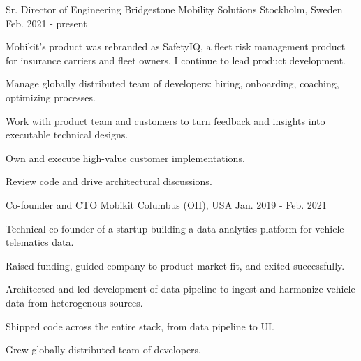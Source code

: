 

\begin{cventries}

  \cventry
    {Sr. Director of Engineering} %
    {Bridgestone Mobility Solutions} %
    {Stockholm, Sweden} %
    {Feb. 2021 - present} %
    {
      \begin{cvitems} %
        \item {Mobikit's product was rebranded as SafetyIQ, a fleet risk management product for insurance carriers and fleet owners. I continue to lead product development.}
        \item {Manage globally distributed team of developers: hiring, onboarding, coaching, optimizing processes.}
        \item {Work with product team and customers to turn feedback and insights into executable technical designs.}
        \item {Own and execute high-value customer implementations.}
        \item {Review code and drive architectural discussions.}
      \end{cvitems}
    }

  \cventry
    {Co-founder and CTO} %
    {Mobikit} %
    {Columbus (OH), USA} %
    {Jan. 2019 - Feb. 2021} %
    {
      \begin{cvitems} %
        \item {Technical co-founder of a startup building a data analytics platform for vehicle telematics data.}
        \item {Raised funding, guided company to product-market fit, and exited successfully.}
        \item {Architected and led development of data pipeline to ingest and harmonize vehicle data from heterogenous sources.}
        \item {Shipped code across the entire stack, from data pipeline to UI.}
        \item {Grew globally distributed team of developers.}
      \end{cvitems}
    }


\end{cventries}
